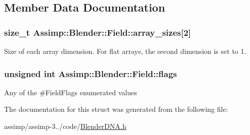\subsection{Member Data Documentation}
\hypertarget{struct_assimp_1_1_blender_1_1_field_af0e199d5f50faf90e6b5a28f0470a7a2}{
\subsubsection[{array\+\_\+sizes}]{\setlength{\rightskip}{0pt plus 5cm}size\+\_\+t Assimp\+::\+Blender\+::\+Field\+::array\+\_\+sizes\mbox{[}2\mbox{]}}}\label{struct_assimp_1_1_blender_1_1_field_af0e199d5f50faf90e6b5a28f0470a7a2}
Size of each array dimension. For flat arrays, the second dimension is set to 1. \hypertarget{struct_assimp_1_1_blender_1_1_field_ab3e399e13c6b9270c031fa303a5ccd9d}{
\subsubsection[{flags}]{\setlength{\rightskip}{0pt plus 5cm}unsigned int Assimp\+::\+Blender\+::\+Field\+::flags}}\label{struct_assimp_1_1_blender_1_1_field_ab3e399e13c6b9270c031fa303a5ccd9d}
Any of the \#\+Field\+Flags enumerated values 

The documentation for this struct was generated from the following file\+:\begin{DoxyCompactItemize}
\item 
assimp/assimp-\/3../code/\hyperlink{_blender_d_n_a_8h}{Blender\+D\+N\+A.\+h}\end{DoxyCompactItemize}
